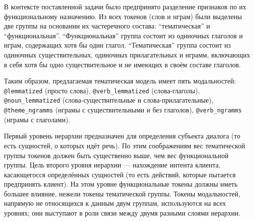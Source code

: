 В контексте поставленной задачи было предпринято разделение признаков по их функциональному назначению. Из всех токенов (слов и нграм) были выделены две группы на основании их частеречного состава: ``тематическая'' и ``функциональная''. ``Функциональная'' группа состоит из одиночных глаголов и нграм, содержащих хотя бы один глагол. ``Тематическая'' группа состоит из одиночных существительных, одиночных прилагательных и нграмм, включающих в себя хотя бы одно существительное и не имеющих в своём составе глаголов.

Таким образом, предлагаемая тематическая модель имеет пять модальностей: \texttt{@lemmatized} (просто слова), \texttt{@verb\_lemmatized} (слова-глаголы), \texttt{@noun\_lemmatized} (слова-существительные и слова-прилагательные), \texttt{@theme\_ngramms} (нграмы с существительными и без глаголов), \texttt{@verb\_ngramms} (нграмы с глаголами).


\par Первый уровень иерархии предназначен для определения субъекта диалога (то есть сущностей, о которых идёт речь). По этим соображениям вес тематической группы токенов должен быть существенно выше, чем вес функциональной группы. Цель второго уровня иерархии --- нахождение интента клиента, касающегосся определённых сущностей (то есть действий, которые пытается предпринять клиент). На этом уровне функциональные токены должны иметь большее влияние, нежели токены тематической группы. Токены модальностей, напрямую не относящихся к данным двум группам, используются на всех уровнях; они выступают в роли связи между двумя разными слоями иерархии.

